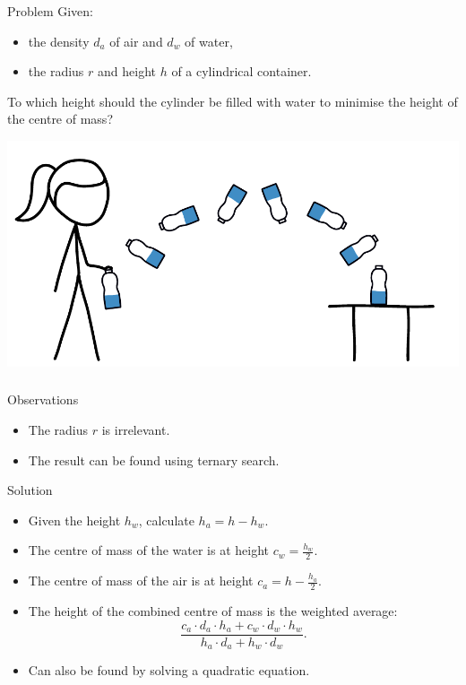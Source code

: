 \begin{frame}
	\frametitle{\problemtitle}
	\begin{block}{Problem}
		Given:
		\begin{itemize}
			\item the density $d_a$ of air and $d_w$ of water,
			\item the radius $r$ and height $h$ of a cylindrical container.
		\end{itemize}
		To which height should the cylinder be filled with water to minimise the
		height of the centre of mass?
	\end{block}
	\pause
	\centering
	\includegraphics[height=0.5\textheight]{sketch}
\end{frame}

\begin{frame}
	\frametitle{\problemtitle}
	\begin{block}{Observations}
		\begin{itemize}
			\item The radius $r$ is irrelevant.
			\pause
			\item The result can be found using ternary search.
		\end{itemize}
	\end{block}
	\pause
	\begin{block}{Solution}
		\begin{itemize}
			\item Given the height $h_w$, calculate $h_a=h-h_w$.
			\item The centre of mass of the water is at height $c_w=\frac{h_w}{2}$.
			\item The centre of mass of the air is at height $c_a=h-\frac{h_a}{2}$.
			\pause
			\item The height of the combined centre of mass is the weighted average\pause:
			\[\frac{c_a\cdot{}d_a\cdot{}h_a+c_w\cdot{}d_w\cdot{}h_w}{h_a\cdot{}d_a+h_w\cdot{}d_w}.\]
			\item Can also be found by solving a quadratic equation.
		\end{itemize}
	\end{block}
	\pause %
	\solvestats
\end{frame}
